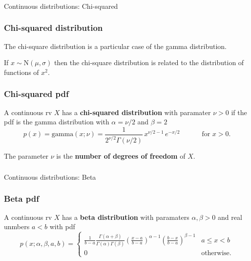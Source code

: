 \begin{frame}[fragile]\frametitle{}
\begin{center}
{\Large Continuous distributions: Chi-squared }

\end{center}
\end{frame}





\begin{frame}[fragile]\frametitle{Chi-squared distribution}

The chi-square distribution is a particular case of
the gamma distribution. 

\vspace{.1in}
If $x \sim \mbox{N}(\mu,\sigma)$ then the chi-square
distribution is related to the distribution of functions 
of $x^2$.
\end{frame}


\begin{frame}[fragile]\frametitle{Chi-squared pdf}

\begin{defn}
A continuous rv $X$ has a {\bf chi-squared distribution}
with paramater $\nu> 0$ if the pdf is the gamma distribution
with $\alpha = \nu/2$ and $\beta=2$
$$p(x) = \mbox{gamma}(x;\nu) = \frac{1}{2^{\nu/2}
  \Gamma(\nu/2)} \, x^{\nu/2-1}\, e^{- x/2} \,\,
\,\,\,\,\,\,\,\,\,\,\,\, \,\,\ \mbox{ for } x > 0.$$  

\vspace{.1in}
The parameter $\nu$ is the {\bf number of  degrees of freedom}
of $X$.

\end{defn} 
\end{frame}

\begin{frame}[fragile]\frametitle{}
\begin{center}
{\Large Continuous distributions: Beta }

\end{center}
\end{frame}



\begin{frame}[fragile]\frametitle{Beta pdf}

\begin{defn}
A continuous rv $X$ has a {\bf beta distribution}
with paramaters $\alpha,\beta>0$ and real unmbers $a<b$ with pdf
$$p(x;\alpha,\beta,a,b) = \left\{\begin{array}{ll}
			\frac{1}{b-a} \frac{\Gamma(\alpha+\beta)}{\Gamma(\alpha)\Gamma(\beta)} \left( \frac{x-a}{b-a} \right)^{\alpha-1} \left( \frac{b-x}{b-a} \right)^{\beta-1}
& a \leq x < b \\
			0 & \mbox{otherwise} 
				   .	\end{array} \right
						. $$ 

\end{defn} 
\end{frame}

